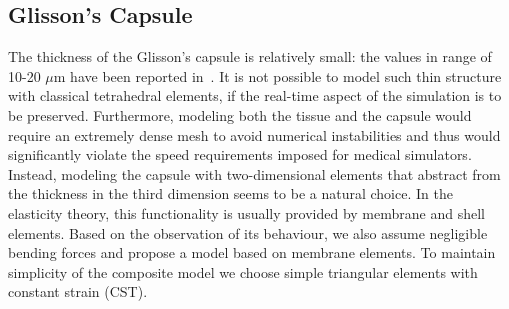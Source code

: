 \documentclass{acm_proc_article-sp}
\begin{document}


\subsection{Glisson's Capsule} %
\label{ss:capsuleModel}
The thickness of the Glisson's capsule is relatively small: the values in range of 10-20
$\mu$m have been reported in~\cite{Umale2011}.
It is not possible to model such thin structure with classical tetrahedral
elements, if the real-time aspect of the simulation is to be preserved.
Furthermore, modeling both the tissue and the capsule would require an extremely 
dense mesh to avoid numerical instabilities and thus would significantly
violate the speed requirements imposed for medical simulators.
Instead, modeling the capsule with two-dimensional elements that abstract from the
thickness in the third dimension seems
to be a natural choice. In the elasticity theory, this functionality is usually provided by membrane and shell elements.
Based on the observation of its behaviour, we also
assume negligible bending forces and propose a model based on membrane
elements. 
To maintain simplicity of the composite model we choose simple triangular
elements with constant strain (CST).
\end{document}
